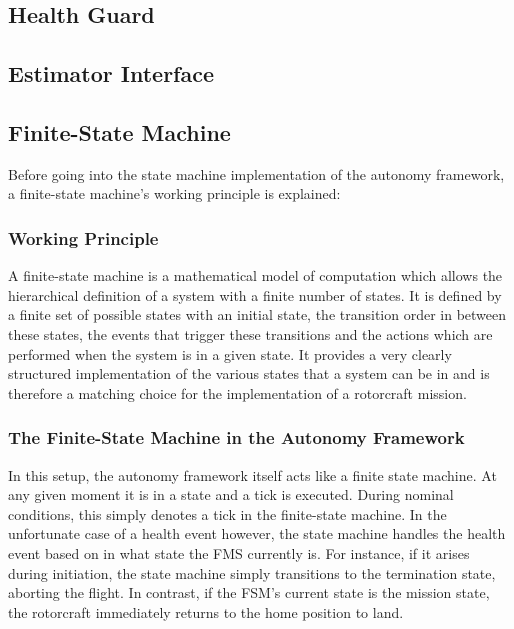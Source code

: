 \subsection{Health Guard}

\subsection{Estimator Interface}

\subsection{Finite-State Machine}

Before going into the state machine implementation of the autonomy framework, a finite-state machine's working principle is explained:

\subsubsection{Working Principle}

A finite-state machine is a mathematical model of computation which allows the hierarchical definition of a system with a finite number of states. It is defined by a finite set of possible states with an initial state, the transition order in between these states, the events that trigger these transitions and the actions which are performed when the system is in a given state. It provides a very clearly structured implementation of the various states that a system can be in and is therefore a matching choice for the implementation of a rotorcraft mission. 

\subsubsection{The Finite-State Machine in the Autonomy Framework}

In this setup, the autonomy framework itself acts like a finite state machine. At any given moment it is in a state and a tick is executed. During nominal conditions, this simply denotes a tick in the finite-state machine. In the unfortunate case of a health event however, the state machine handles the health event based on in what state the FMS currently is. For instance, if it arises during initiation, the state machine simply transitions to the termination state, aborting the flight. In contrast, if the FSM's current state is the mission state, the rotorcraft immediately returns to the home position to land.

